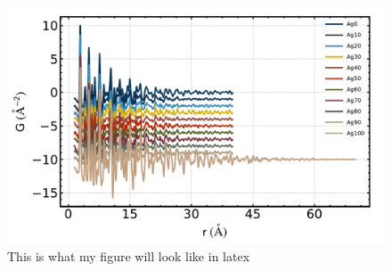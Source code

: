 \documentclass[twocolumn,showpacs,amsmath,amssymb,floatfix,prl]{revtex4-1}
\begin{document}
\lipsum[7-9]
\begin{figure}[tb]
	\centering
	\includegraphics[width=1\columnwidth]{Example_3_WaterfallMeas}
	\caption{\label{fig}This is what my figure will look like in latex }
\end{figure}
\lipsum[5-7]
\end{document}
